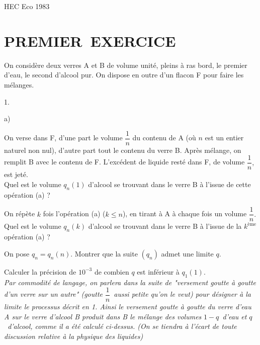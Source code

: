 \documentclass[11pt]{article}%
\begin{document}
\begin{center}
{\huge HEC Eco 1983}
\end{center}

\section*{PREMIER\ EXERCICE}

On considère deux verres A et B de volume unité, pleins à ras bord, le
premier d'eau, le second d'alcool pur. On dispose en outre d'un flacon
F
pour faire les mélanges.

\begin{noliste}{1.}
 \setlength{\itemsep}{4mm}
\item 

\begin{noliste}{a)}
 \setlength{\itemsep}{2mm}
\item On verse dans F, d'une part le volume $\dfrac{1}{n}$ du contenu
de A (où $n$ est un entier naturel non nul), d'autre part tout le
contenu du verre
B. Après mélange, on remplit B avec le contenu de F. L'excédent de
liquide
resté dans F, de volume $\dfrac{1}{n},$ est jeté.\\
Quel est le volume $q_{n}(1)$ d'alcool se trouvant dans le verre B à
l'issue
de cette opération (a) ?

\item On répète $k$ fois l'opération (a) ($k\leq n$), en tirant à A à
chaque fois un volume $\dfrac{1}{n}.$\\
Quel est le volume $q_{n}(k)$ d'alcool se trouvant dans le verre B à
l'issue
de la $k^{\text{ème}}$ opération (a) ?

\item On pose $q_{n} = q_{n}(n).$ Montrer que la suite $(q_{n})$ admet
une
limite $q.$

\item Calculer la précision de $10^{-3}$ de combien $q$ est inférieur à
$q_{1}(1).$\\
\emph{Par commodité de langage, on parlera dans la suite de "versement
goutte à goutte d'un verre sur un autre" (goutte }$\dfrac{1}{n}$\emph{\
aussi petite qu'on le veut) pour désigner à la limite le processus
décrit en
1. Ainsi le versement goutte à goutte du verre d'eau A sur le verre
d'alcool
B produit dans B le mélange des volumes }$1-q$\emph{\ d'eau et
}$q$\emph{\
d'alcool, comme il a été calculé ci-dessus. (On se tiendra à l'écart de
toute discussion relative à la physique des liquides)}
\end{noliste}


\end{noliste}
\end{document}
